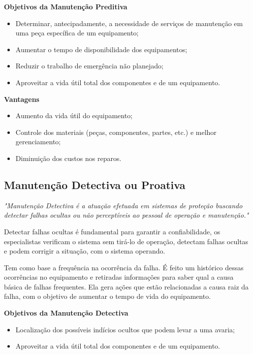 		\textbf{Objetivos da Manutenção Preditiva}

			\begin{itemize}
				\item Determinar, antecipadamente, a necessidade de serviços de manutenção em uma peça específica de um equipamento;  
				\item Aumentar o tempo de disponibilidade dos equipamentos;
				\item Reduzir o trabalho de emergência não planejado;  
				\item Aproveitar a vida útil total dos componentes e de um equipamento.
			\end{itemize}

		\textbf{Vantagens}

			\begin{itemize}
				\item Aumento da vida útil do equipamento; 
				\item Controle dos materiais (peças, componentes, partes, etc.) e melhor gerenciamento; 
				\item Diminuição dos custos nos reparos.
			\end{itemize}
		

\subsection{Manutenção Detectiva ou Proativa}

		\emph{"Manutenção Detectiva é a atuação efetuada em sistemas de proteção buscando detectar falhas ocultas ou não perceptíveis ao pessoal de operação e manutenção."} \cite{kardecnascif2010}

		Detectar falhas ocultas é fundamental para garantir a confiabilidade, os especialistas verificam o sistema sem tirá-lo de operação, detectam falhas ocultas e podem corrigir a situação, com o sistema operando.

		Tem como base a frequência na ocorrência da falha. É feito um histórico dessas ocorrências no equipamento e retiradas informações para saber qual a causa básica de falhas frequentes. Ela gera ações que estão relacionadas a causa raiz da falha, com o objetivo de aumentar o tempo de vida do equipamento.

		\textbf{Objetivos da Manutenção Detectiva}

			\begin{itemize}
				\item Localização dos possíveis indícios ocultos que podem levar a uma avaria; 
				\item Aproveitar a vida útil total dos componentes e de um equipamento.
			\end{itemize}


